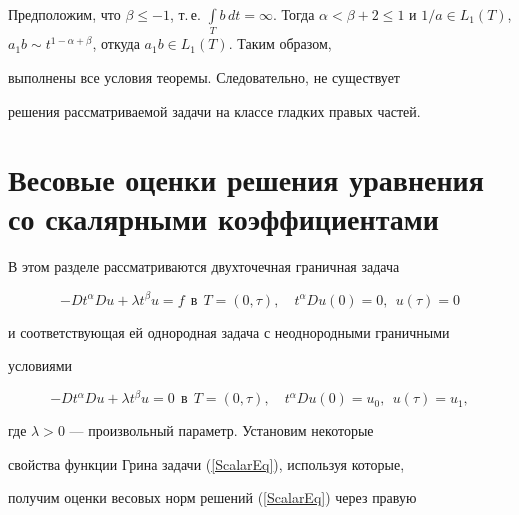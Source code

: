 \begin{pf} 


Предположим, что $\beta \le -1$, т.\,е. $\int\limits_T b\,dt


=\infty$. Тогда $\alpha < \beta+2 \le 1$ и $1/a \in L_1(T)$, $a_1b


\sim t^{1-\alpha+\beta}$, откуда $a_1b \in L_1(T)$. Таким образом,


выполнены все условия теоремы. Следовательно, не существует


решения рассматриваемой задачи на классе гладких правых частей.


\end{pf}











\section{Весовые оценки решения уравнения со скалярными коэффициентами}





В этом разделе рассматриваются двухточечная граничная задача


\begin{equation}\label{ScalarEq}


-Dt^\alpha Du + \lambda t^\beta u =f \ \ \text{в}\ \ T=(0,\tau), \quad


t^\alpha Du (0)=0,\ \ u(\tau)=0


\end{equation}


и соответствующая ей однородная задача с неоднородными граничными


условиями


\begin{equation}\label{ScalarEqZero}


-Dt^\alpha Du + \lambda t^\beta u =0 \ \ \text{в}\ \ T=(0,\tau), \quad


t^\alpha Du (0)=u_0,\ \ u(\tau)=u_1,


\end{equation} 


где $\lambda > 0$ --- произвольный параметр. Установим некоторые


свойства функции Грина задачи (\ref{ScalarEq}), используя которые,


получим оценки весовых норм решений (\ref{ScalarEq}) через правую



